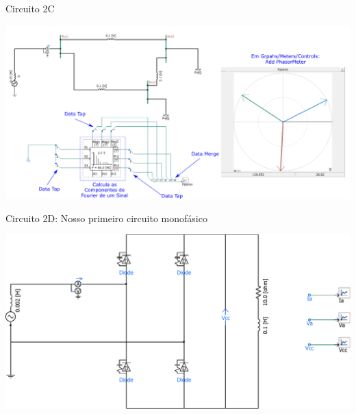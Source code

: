 \begin{frame}{Circuito 2C}
\centering



\includegraphics[width=0.95\linewidth]{./figuras/Segundo-Circuito/SIM2c}



\end{frame}







\begin{frame}{Circuito 2D: Nosso primeiro circuito monofásico}
\centering



\includegraphics[width=0.75\linewidth]{./figuras/Segundo-Circuito/SIM2d}



\end{frame}






